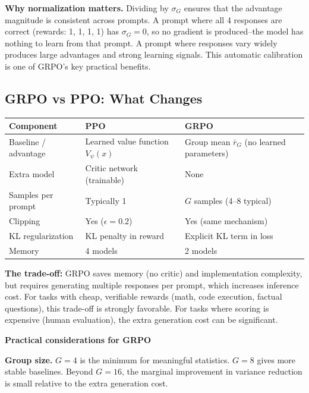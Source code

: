 \begin{chapterenv}
\begin{tipbox}
\textbf{Why normalization matters.} Dividing by $\sigma_G$ ensures that the advantage magnitude is consistent across prompts. A prompt where all 4 responses are correct (rewards: 1, 1, 1, 1) has $\sigma_G = 0$, so no gradient is produced--the model has nothing to learn from that prompt. A prompt where responses vary widely produces large advantages and strong learning signals. This automatic calibration is one of GRPO's key practical benefits.
\end{tipbox}

\subsection{GRPO vs PPO: What Changes}

\begin{center}
\begin{tabular}{p{}p{}p{}}
\toprule
\textbf{Component} & \textbf{PPO} & \textbf{GRPO} \\
\midrule
Baseline / advantage & Learned value function $V_\psi(x)$ & Group mean $\bar{r}_G$ (no learned parameters) \\
Extra model & Critic network (trainable) & None \\
Samples per prompt & Typically 1 & $G$ samples (4--8 typical) \\
Clipping & Yes ($\epsilon = 0.2$) & Yes (same mechanism) \\
KL regularization & KL penalty in reward & Explicit KL term in loss \\
Memory & 4 models & 2 models \\
\bottomrule
\end{tabular}
\end{center}

\textbf{The trade-off:} GRPO saves memory (no critic) and implementation complexity, but requires generating multiple responses per prompt, which increases inference cost. For tasks with cheap, verifiable rewards (math, code execution, factual questions), this trade-off is strongly favorable. For tasks where scoring is expensive (human evaluation), the extra generation cost can be significant.

\begin{infobox}
\textbf{Practical considerations for GRPO}

\textbf{Group size.} $G = 4$ is the minimum for meaningful statistics. $G = 8$ gives more stable baselines. Beyond $G = 16$, the marginal improvement in variance reduction is small relative to the extra generation cost.


\end{infobox}
\end{chapterenv}
